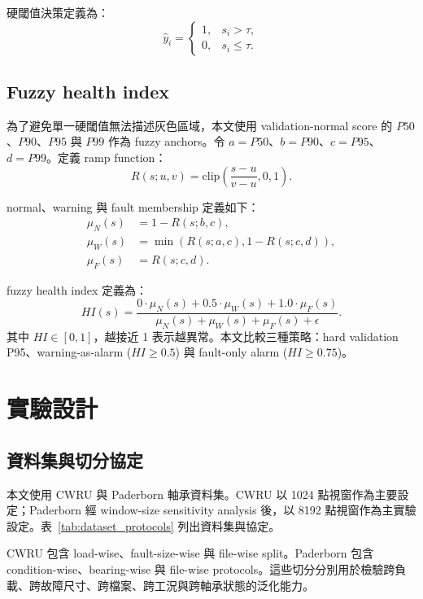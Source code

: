 \documentclass[12pt,a4paper]{article}
\newcommand{\hi}{HI}
\begin{document}
硬閾值決策定義為：
\begin{equation}
\hat{y}_i=\begin{cases}
1, & s_i>\tau,\\
0, & s_i\leq\tau.
\end{cases}
\end{equation}

\subsection{Fuzzy health index}

為了避免單一硬閾值無法描述灰色區域，本文使用 validation-normal score 的 $P50$、$P90$、$P95$ 與 $P99$ 作為 fuzzy anchors。令 $a=P50$、$b=P90$、$c=P95$、$d=P99$。定義 ramp function：
\begin{equation}
R(s;u,v)=\mathrm{clip}\left(\frac{s-u}{v-u},0,1\right).
\end{equation}

normal、warning 與 fault membership 定義如下：
\begin{align}
\mu_N(s)&=1-R(s;b,c),\\
\mu_W(s)&=\min(R(s;a,c),1-R(s;c,d)),\\
\mu_F(s)&=R(s;c,d).
\end{align}

fuzzy health index 定義為：
\begin{equation}
\hi(s)=\frac{0\cdot\mu_N(s)+0.5\cdot\mu_W(s)+1.0\cdot\mu_F(s)}{\mu_N(s)+\mu_W(s)+\mu_F(s)+\epsilon}.
\end{equation}
其中 $\hi\in[0,1]$，越接近 1 表示越異常。本文比較三種策略：hard validation P95、warning-as-alarm ($\hi\geq0.5$) 與 fault-only alarm ($\hi\geq0.75$)。

\section{實驗設計}

\subsection{資料集與切分協定}

本文使用 CWRU 與 Paderborn 軸承資料集。CWRU 以 1024 點視窗作為主要設定；Paderborn 經 window-size sensitivity analysis 後，以 8192 點視窗作為主實驗設定。表~\ref{tab:dataset_protocols} 列出資料集與協定。



CWRU 包含 load-wise、fault-size-wise 與 file-wise split。Paderborn 包含 condition-wise、bearing-wise 與 file-wise protocols。這些切分分別用於檢驗跨負載、跨故障尺寸、跨檔案、跨工況與跨軸承狀態的泛化能力。
\end{document}

